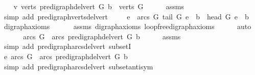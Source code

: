 \begin{isabellebody}
\ \ \isamarkupfalse%
\ v{\isacharcolon}{\kern0pt}\ {\isachardoublequoteopen}verts\ {\isacharparenleft}{\kern0pt}pre{\isacharunderscore}{\kern0pt}digraph{\isachardot}{\kern0pt}del{\isacharunderscore}{\kern0pt}vert\ G\ b{\isacharparenright}{\kern0pt}\ {\isacharequal}{\kern0pt}\ verts\ G{\isachardoublequoteclose}\isanewline
\ \ \ \ \isamarkupfalse%
\ assms{\isacharparenleft}{\kern0pt}{}{\isacharparenright}{\kern0pt}\isanewline
\ \ \ \ \isamarkupfalse%
\ {\isacharparenleft}{\kern0pt}simp\ add{\isacharcolon}{\kern0pt}\ pre{\isacharunderscore}{\kern0pt}digraph{\isachardot}{\kern0pt}verts{\isacharunderscore}{\kern0pt}del{\isacharunderscore}{\kern0pt}vert{\isacharparenright}{\kern0pt}\ \isanewline
\ \ \isamarkupfalse%
\ {\isachardoublequoteopen}{\isasymforall}e\ {\isasymin}\ arcs\ G{\isachardot}{\kern0pt}\ tail\ G\ e\ {\isasymnoteq}\ b\ {\isasymand}\ head\ G\ e\ {\isasymnoteq}\ b\ {\isachardoublequoteclose}\ \isamarkupfalse%
\ digraph{\isacharunderscore}{\kern0pt}axioms\isanewline
\ \ \ \ \ \ assms\ digraph{\isachardot}{\kern0pt}axioms{\isacharparenleft}{\kern0pt}{}{\isacharparenright}{\kern0pt}\ loopfree{\isacharunderscore}{\kern0pt}digraph{\isachardot}{\kern0pt}axioms{\isacharparenleft}{\kern0pt}{}{\isacharparenright}{\kern0pt}\isanewline
\ \ \ \ \isamarkupfalse%
\ auto\ \isanewline
\ \ \isamarkupfalse%
\ \isamarkupfalse%
\ {\isachardoublequoteopen}\ arcs\ G\ {\isasymsubseteq}\ arcs\ {\isacharparenleft}{\kern0pt}pre{\isacharunderscore}{\kern0pt}digraph{\isachardot}{\kern0pt}del{\isacharunderscore}{\kern0pt}vert\ G\ b{\isacharparenright}{\kern0pt}{\isachardoublequoteclose}\isanewline
\ \ \ \ \isamarkupfalse%
\ assms\isanewline
\ \ \ \ \isamarkupfalse%
\ {\isacharparenleft}{\kern0pt}simp\ add{\isacharcolon}{\kern0pt}\ pre{\isacharunderscore}{\kern0pt}digraph{\isachardot}{\kern0pt}arcs{\isacharunderscore}{\kern0pt}del{\isacharunderscore}{\kern0pt}vert\ subsetI{\isacharparenright}{\kern0pt}\ \isanewline
\ \ \isamarkupfalse%
\ \isamarkupfalse%
\ e{\isacharcolon}{\kern0pt}\ {\isachardoublequoteopen}arcs\ G\ {\isacharequal}{\kern0pt}\ arcs\ {\isacharparenleft}{\kern0pt}pre{\isacharunderscore}{\kern0pt}digraph{\isachardot}{\kern0pt}del{\isacharunderscore}{\kern0pt}vert\ G\ b{\isacharparenright}{\kern0pt}{\isachardoublequoteclose}\isanewline
\ \ \ \ \isamarkupfalse%
\ {\isacharparenleft}{\kern0pt}simp\ add{\isacharcolon}{\kern0pt}\ pre{\isacharunderscore}{\kern0pt}digraph{\isachardot}{\kern0pt}arcs{\isacharunderscore}{\kern0pt}del{\isacharunderscore}{\kern0pt}vert\ subset{\isacharunderscore}{\kern0pt}antisym{\isacharparenright}{\kern0pt}\isanewline

\end{isabellebody}
